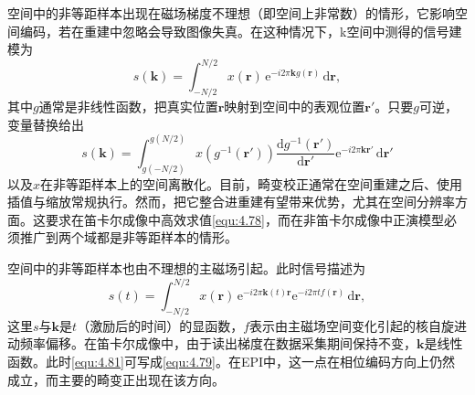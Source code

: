 \documentclass[12pt]{article}
\let\originallautoref\autoref
\renewcommand{\autoref}[1]{\allowbreak\originallautoref{#1}}
\begin{document}
空间中的非等距样本出现在磁场梯度不理想（即空间上非常数）的情形，它影响空间编码，若在重建中忽略会导致图像失真。在这种情况下，k空间中测得的信号建模为
\begin{equation}
    s(\bm{k})=\int_{-N/2}^{N/2}x(\bm{r})\,\mathrm{e}^{-i2\pi\bm{k}g(\bm{r})}\,\mathrm{d}\bm{r},
    \label{equ:4.79}
\end{equation}
其中$g$通常是非线性函数，把真实位置$\bm{r}$映射到空间中的表观位置$\bm{r}'$。只要$g$可逆，变量替换给出
\begin{equation}
    s(\bm{k})=\int_{g(-N/2)}^{g(N/2)}x\left(g^{-1}(\bm{r}')\right)\frac{\mathrm{d}g^{-1}(\bm{r}')}{\mathrm{d}\bm{r}'}\mathrm{e}^{-i2\pi\bm{k}\bm{r}'}\,\mathrm{d}\bm{r}'
    \label{equ:4.80}
\end{equation}
以及$x$在非等距样本上的空间离散化。目前，畸变校正通常在空间重建之后、使用插值与缩放常规执行。然而，把它整合进重建有望带来优势，尤其在空间分辨率方面。这要求在笛卡尔成像中高效求值\autoref{equ:4.78}，而在非笛卡尔成像中正演模型必须推广到两个域都是非等距样本的情形。

空间中的非等距样本也由不理想的主磁场引起。此时信号描述为
\begin{equation}
    s(t)=\int_{-N/2}^{N/2}x(\bm{r})\,\mathrm{e}^{-i2\pi\bm{k}(t)\bm{r}}\mathrm{e}^{-i2\pi tf(\bm{r})}\,\mathrm{d}\bm{r},
    \label{equ:4.81}
\end{equation}
这里$s$与$\bm{k}$是$t$（激励后的时间）的显函数，$f$表示由主磁场空间变化引起的核自旋进动频率偏移。在笛卡尔成像中，由于读出梯度在数据采集期间保持不变，$\bm{k}$是线性函数。此时\autoref{equ:4.81}可写成\autoref{equ:4.79}。在EPI中，这一点在相位编码方向上仍然成立，而主要的畸变正出现在该方向。
\end{document}
